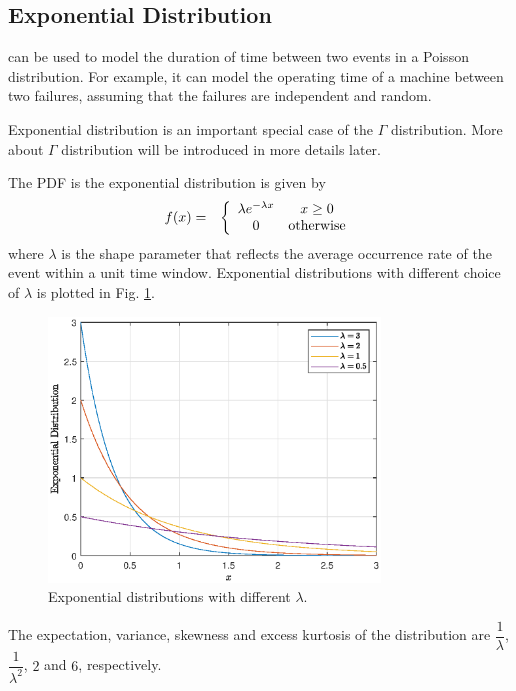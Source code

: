 \subsection{Exponential Distribution} \label{sec:exponential_distribution}

 can be used to model the duration of time between two events in a Poisson distribution. For example, it can model the operating time of a machine between two failures, assuming that the failures are independent and random.

Exponential distribution is an important special case of the $\Gamma$ distribution. More about $\Gamma$ distribution will be introduced in more details later.

The PDF is the exponential distribution is given by
\begin{eqnarray}
	f(x) &=& \left\{\begin{array}{cc}
		\lambda e^{-\lambda x} & x \geq 0 \\
		0 & \textup{otherwise}
	\end{array}\right. \label{eq:exponential_pdf}
\end{eqnarray}
where $\lambda$ is the shape parameter that reflects the average occurrence rate of the event within a unit time window. Exponential distributions with different choice of $\lambda$ is plotted in Fig. \ref{fig:exponential}.
\begin{figure}[!htb]
	\centering
	\includegraphics[width=250pt]{chapters/part-1/figures/exponential_pdf.eps}
	\caption{Exponential distributions with different $\lambda$.} \label{fig:exponential}
\end{figure}

The expectation, variance, skewness and excess kurtosis of the distribution are $\dfrac{1}{\lambda}$, $\dfrac{1}{\lambda^2}$, $2$ and $6$, respectively.

